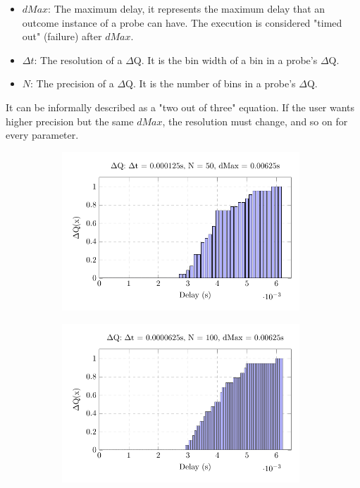     \begin{itemize}
        \item $dMax$: The maximum delay, it represents the maximum delay that an outcome instance of a probe can have. The execution is considered "timed out" (failure) after $dMax$.
        \item $\Delta t$: The resolution of a $\Delta$Q. It is the bin width of a bin in a probe's $\Delta$Q.
        \item $N$: The precision of a $\Delta$Q. It is the number of bins in a probe's $\Delta$Q.
    \end{itemize}
    
    It can be informally described as a "two out of three" equation. If the user wants higher precision but the same $dMax$, the resolution must change, and so on for every parameter.
        \begin{figure}[H]
            \centering
            \begin{subfigure}{.5\textwidth}
                \centering
                \includegraphics[width =0.98\textwidth]{tikz/hist_50.pdf}
                \label{fig:hist_50}
            \end{subfigure}%
            \begin{subfigure}{.5\textwidth}%
                \centering%
                \includegraphics[width =0.98\textwidth]{tikz/hist_100.pdf}%

\end{subfigure}
\end{figure}
